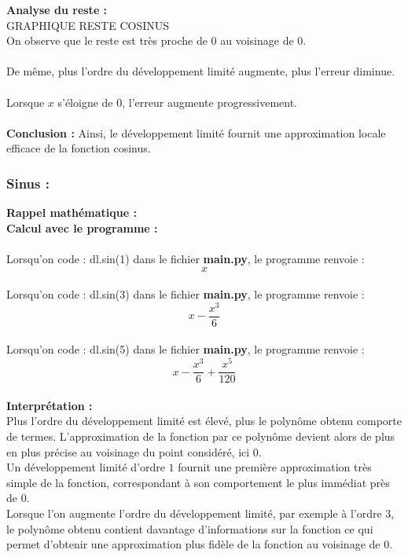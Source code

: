 \documentclass{article}
\begin{document}
\textbf{Analyse du reste :} \\
GRAPHIQUE RESTE COSINUS\\
On observe que le reste est très proche de 0 au voisinage de 0. \\ \\
De même, plus l’ordre du développement limité augmente, plus l’erreur diminue.\\ \\
Lorsque $x$ s’éloigne de 0, l’erreur augmente progressivement. \\ \\
\textbf{Conclusion :} Ainsi, le développement limité fournit une approximation locale efficace de la fonction cosinus.


\subsubsection{Sinus :}
\textbf{Rappel mathématique : } \\
{}
\textbf{Calcul avec le programme :} \\
\\
Lorsqu'on code : dl.sin(1) dans le fichier \textbf{main.py}, le programme renvoie : $$x$$ \\
Lorsqu'on code : dl.sin(3) dans le fichier \textbf{main.py}, le programme renvoie : 
$$x-\frac{x^3}{6}$$ \\
Lorsqu'on code : dl.sin(5) dans le fichier \textbf{main.py}, le programme renvoie :
$$x-\frac{x^3}{6}+\frac{x^5}{120}$$ \\
\textbf{Interprétation :} \\
Plus l’ordre du développement limité est élevé, plus le polynôme obtenu comporte de termes. L’approximation de la fonction par ce polynôme devient alors de plus en plus précise au voisinage du point considéré, ici $0$. \\
Un développement limité d’ordre $1$ fournit une première approximation très simple de la fonction, correspondant à son comportement le plus immédiat près de $0$. \\

Lorsque l’on augmente l’ordre du développement limité, par exemple à l’ordre $3$, le polynôme obtenu contient davantage d’informations sur la fonction ce qui permet d’obtenir une approximation plus fidèle de la fonction au voisinage de $0$. \\
\end{document}

